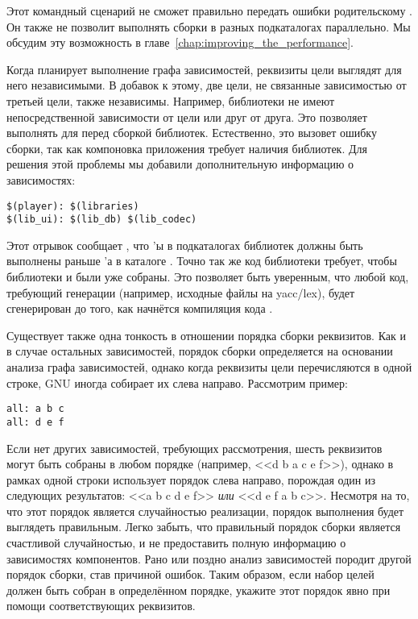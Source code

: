 Этот командный сценарий не сможет правильно передать ошибки
родительскому \GNUmake{}. Он также не позволит \GNUmake{} выполнять
сборки в разных подкаталогах параллельно. Мы обсудим эту возможность
\GNUmake{} в главе~\ref{chap:improving_the_performance}.

Когда \GNUmake{} планирует выполнение графа зависимостей, реквизиты
цели выглядят для него независимыми. В добавок к этому, две
цели, не связанные зависимостью от третьей цели, также
независимы. Например, библиотеки не  имеют непосредственной
зависимости от цели  или друг от друга. Это
позволяет \GNUmake{} выполнять \Makefile{} для 
перед сборкой библиотек. Естественно, это вызовет ошибку сборки, так
как компоновка приложения требует наличия библиотек. Для решения этой
проблемы мы добавили дополнительную информацию о зависимостях:

{\footnotesize
\begin{verbatim}
$(player): $(libraries)
$(lib_ui): $(lib_db) $(lib_codec)
\end{verbatim}
}

Этот отрывок сообщает \GNUmake{}, что \Makefile{}'ы в подкаталогах
библиотек должны быть выполнены раньше \Makefile{}'а в каталоге
. Точно так же код библиотеки 
требует, чтобы библиотеки  и 
были уже собраны. Это позволяет быть уверенным, что любой код,
требующий генерации (например, исходные файлы на yacc/lex), будет
сгенерирован до того, как начнётся компиляция кода .

Существует также одна тонкость в отношении порядка сборки
реквизитов. Как и в случае остальных зависимостей, порядок сборки
определяется на основании анализа графа зависимостей, однако когда
реквизиты цели перечисляются в одной строке, GNU \GNUmake{} иногда
собирает их слева направо. Рассмотрим пример:

{\footnotesize
\begin{verbatim}
all: a b c
all: d e f
\end{verbatim}
}

Если нет других зависимостей, требующих рассмотрения, шесть реквизитов
могут быть собраны в любом порядке (например, <<d b a c e f>>), однако
\GNUmake{} в рамках одной строки использует порядок слева направо,
порождая один из следующих результатов: <<a b c d e f>> \emph{или} <<d
e f a b c>>. Несмотря на то, что этот порядок является случайностью
реализации, порядок выполнения будет выглядеть правильным. Легко
забыть, что правильный порядок сборки является счастливой
случайностью, и не предоставить \GNUmake{} полную информацию о
зависимостях компонентов. Рано или поздно анализ зависимостей породит
другой порядок сборки, став причиной ошибок. Таким образом, если набор
целей должен быть собран в определённом порядке, укажите этот порядок
явно при помощи соответствующих реквизитов.


